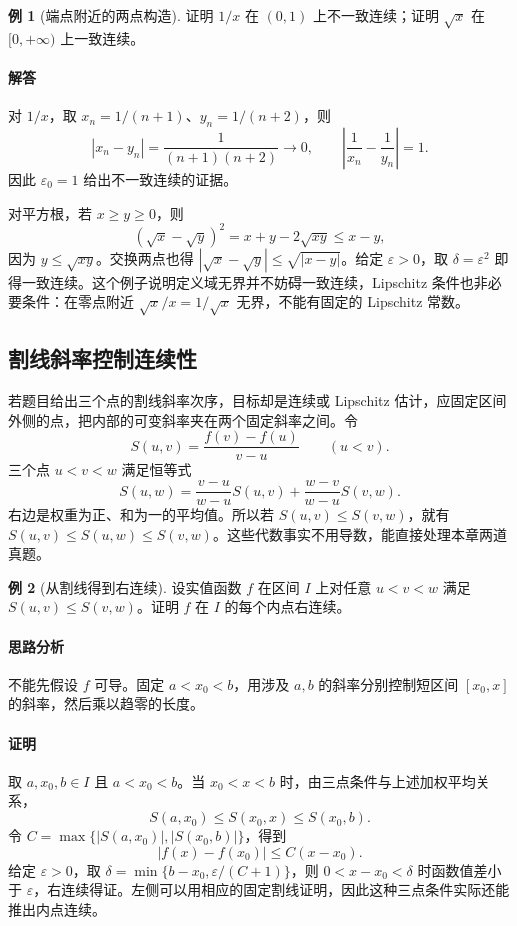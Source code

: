 \documentclass[UTF8,fontset=fandol,12pt,oneside,openany]{ctexrep}
\theoremstyle{definition}
\newtheorem{example}{例}[chapter]
\begin{document}
\begin{example}[端点附近的两点构造]
证明 $1/x$ 在 $(0,1)$ 上不一致连续；证明 $\sqrt{x}$ 在 $[0,+\infty)$ 上一致连续。
\end{example}
\paragraph{解答}
对 $1/x$，取 $x_n=1/(n+1)$、$y_n=1/(n+2)$，则
\[
 |x_n-y_n|=\frac1{(n+1)(n+2)}\to0,
 \qquad \left|\frac1{x_n}-\frac1{y_n}\right|=1.
\]
因此 $\varepsilon_0=1$ 给出不一致连续的证据。

对平方根，若 $x\ge y\ge0$，则
\[
 (\sqrt{x}-\sqrt{y})^2=x+y-2\sqrt{xy}\le x-y,
\]
因为 $y\le\sqrt{xy}$。交换两点也得 $|\sqrt{x}-\sqrt{y}|\le\sqrt{|x-y|}$。给定 $\varepsilon>0$，取 $\delta=\varepsilon^2$ 即得一致连续。这个例子说明定义域无界并不妨碍一致连续，Lipschitz 条件也非必要条件：在零点附近 $\sqrt{x}/x=1/\sqrt{x}$ 无界，不能有固定的 Lipschitz 常数。

\subsection{割线斜率控制连续性}
\label{lec:04:secants}
若题目给出三个点的割线斜率次序，目标却是连续或 Lipschitz 估计，应固定区间外侧的点，把内部的可变斜率夹在两个固定斜率之间。令
\[
 S(u,v)=\frac{f(v)-f(u)}{v-u}\qquad(u<v).
\]
三个点 $u<v<w$ 满足恒等式
\[
 S(u,w)=\frac{v-u}{w-u}S(u,v)+\frac{w-v}{w-u}S(v,w).
\]
右边是权重为正、和为一的平均值。所以若 $S(u,v)\le S(v,w)$，就有 $S(u,v)\le S(u,w)\le S(v,w)$。这些代数事实不用导数，能直接处理本章两道真题。

\begin{example}[从割线得到右连续]
设实值函数 $f$ 在区间 $I$ 上对任意 $u<v<w$ 满足 $S(u,v)\le S(v,w)$。证明 $f$ 在 $I$ 的每个内点右连续。
\end{example}
\paragraph{思路分析}
不能先假设 $f$ 可导。固定 $a<x_0<b$，用涉及 $a,b$ 的斜率分别控制短区间 $[x_0,x]$ 的斜率，然后乘以趋零的长度。
\paragraph{证明}
取 $a,x_0,b\in I$ 且 $a<x_0<b$。当 $x_0<x<b$ 时，由三点条件与上述加权平均关系，
\[
 S(a,x_0)\le S(x_0,x)\le S(x_0,b).
\]
令 $C=\max\{|S(a,x_0)|,|S(x_0,b)|\}$，得到
\[
 |f(x)-f(x_0)|\le C(x-x_0).
\]
给定 $\varepsilon>0$，取 $\delta=\min\{b-x_0,\varepsilon/(C+1)\}$，则 $0<x-x_0<\delta$ 时函数值差小于 $\varepsilon$，右连续得证。左侧可以用相应的固定割线证明，因此这种三点条件实际还能推出内点连续。
\end{document}
